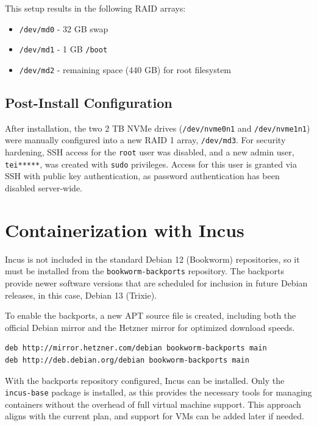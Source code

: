 This setup results in the following RAID arrays:

\begin{itemize}
  \item \texttt{/dev/md0} - 32 GB swap
  \item \texttt{/dev/md1} - 1 GB \texttt{/boot}
  \item \texttt{/dev/md2} - remaining space (440 GB) for root filesystem
\end{itemize}

\subsection*{Post-Install Configuration}

After installation, the two 2 TB NVMe drives (\texttt{/dev/nvme0n1} and \texttt{/dev/nvme1n1}) were manually configured into a new RAID 1 array, \texttt{/dev/md3}. For security hardening, SSH access for the \texttt{root} user was disabled, and a new admin user, \texttt{tei*****}, was created with \texttt{sudo} privileges. Access for this user is granted via SSH with public key authentication, as password authentication has been disabled server-wide.

\section{Containerization with Incus}

Incus is not included in the standard Debian 12 (Bookworm) repositories, so it must be installed from the \texttt{bookworm-backports} repository. The backports provide newer software versions that are scheduled for inclusion in future Debian releases, in this case, Debian 13 (Trixie).

To enable the backports, a new APT source file is created, including both the official Debian mirror and the Hetzner mirror for optimized download speeds.

\begin{lstlisting}[language=bash,caption={APT sources list to enable the bookworm-backports repository.}]
deb http://mirror.hetzner.com/debian bookworm-backports main
deb http://deb.debian.org/debian bookworm-backports main
\end{lstlisting}

With the backports repository configured, Incus can be installed. Only the \texttt{incus-base} package is installed, as this provides the necessary tools for managing containers without the overhead of full virtual machine support. This approach aligns with the current plan, and support for VMs can be added later if needed.

